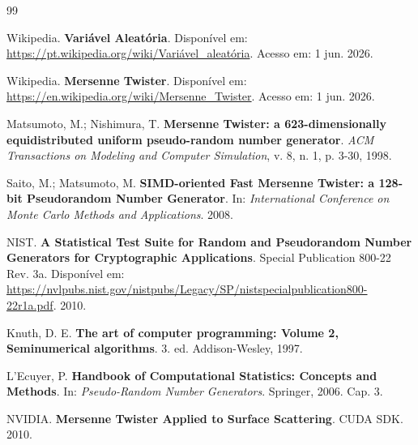 \documentclass[12pt,a4paper]{article}
\begin{document}
\begin{thebibliography}{99}

Wikipedia. \textbf{Variável Aleatória}. Disponível em: \url{https://pt.wikipedia.org/wiki/Variável_aleatória}. Acesso em: 1 jun. 2026.

Wikipedia. \textbf{Mersenne Twister}. Disponível em: \url{https://en.wikipedia.org/wiki/Mersenne_Twister}. Acesso em: 1 jun. 2026.

Matsumoto, M.; Nishimura, T. \textbf{Mersenne Twister: a 623-dimensionally equidistributed uniform pseudo-random number generator}. \textit{ACM Transactions on Modeling and Computer Simulation}, v. 8, n. 1, p. 3-30, 1998.

Saito, M.; Matsumoto, M. \textbf{SIMD-oriented Fast Mersenne Twister: a 128-bit Pseudorandom Number Generator}. In: \textit{International Conference on Monte Carlo Methods and Applications}. 2008.

NIST. \textbf{A Statistical Test Suite for Random and Pseudorandom Number Generators for Cryptographic Applications}. Special Publication 800-22 Rev. 3a. Disponível em: \url{https://nvlpubs.nist.gov/nistpubs/Legacy/SP/nistspecialpublication800-22r1a.pdf}. 2010.

Knuth, D. E. \textbf{The art of computer programming: Volume 2, Seminumerical algorithms}. 3. ed. Addison-Wesley, 1997.

L'Ecuyer, P. \textbf{Handbook of Computational Statistics: Concepts and Methods}. In: \textit{Pseudo-Random Number Generators}. Springer, 2006. Cap. 3.

NVIDIA. \textbf{Mersenne Twister Applied to Surface Scattering}. CUDA SDK. 2010.

\end{thebibliography}
\end{document}
